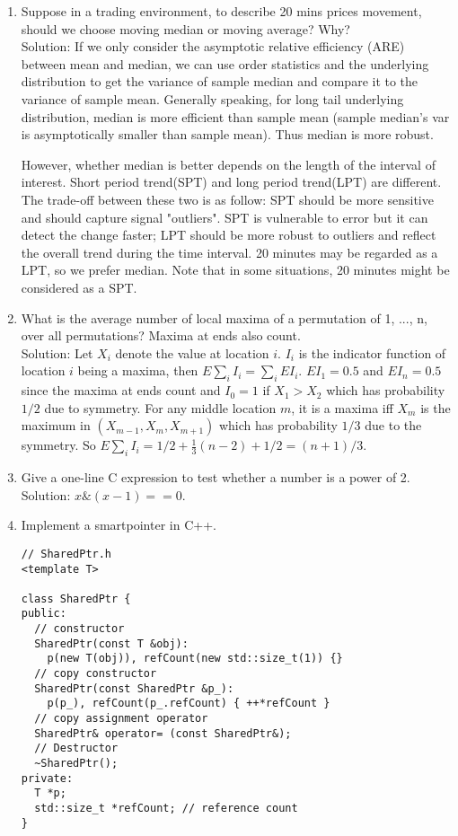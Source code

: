 \documentclass[10pt, onecolumn, draftcls]{IEEEtran}
\begin{document}
\begin{enumerate}
\item
Suppose in a trading environment, to describe 20 mins prices movement, should we choose moving median or moving average? Why?\\
{\color{red} Solution}: If we only consider the asymptotic relative efficiency (ARE) between mean and median, we can use order statistics and the underlying distribution to get the variance of sample median and compare it to the variance of sample mean. Generally speaking, for long tail underlying distribution, median is more efficient than sample mean (sample median's var is asymptotically smaller than sample mean). Thus median is more robust.
 
However, whether median is better depends on the length of the interval of interest. Short period trend(SPT) and long period trend(LPT) are different. The trade-off between these two is as follow: SPT should be more sensitive and should capture signal "outliers". SPT is vulnerable to error but it can detect the change faster; LPT should be more robust to outliers and reflect the overall trend during the time interval. 20 minutes may be regarded as a LPT, so we prefer median. Note that in some situations, 20 minutes might be considered as a SPT.

\item
What is the average number of local maxima of a permutation of 1, ..., n, over all permutations? Maxima at ends also count.\\
{\color{red} Solution}: Let $X_i$ denote the value at location $i$. $I_i$ is the indicator function of location $i$ being a maxima, then $E\sum_iI_i=\sum_iEI_i.$ $EI_1=0.5$ and $EI_n=0.5$ since the maxima at ends count and $I_0=1$ if $X_1>X_2$ which has probability $1/2$ due to symmetry. For any middle location $m$, it is a maxima iff $X_m$ is the maximum in $(X_{m-1},X_m,X_{m+1})$ which has probability $1/3$ due to the symmetry. So $E\sum_iI_i=1/2+\frac{1}{3}(n-2)+1/2=(n+1)/3.$

\item
Give a one-line C expression to test whether a number is a power of 2.\\
{\color{red} Solution}: $x\&(x-1)==0$.
\item
Implement a smartpointer in C++.
\begin{lstlisting}
// SharedPtr.h
<template T>

class SharedPtr {
public:
  // constructor
  SharedPtr(const T &obj):
    p(new T(obj)), refCount(new std::size_t(1)) {}
  // copy constructor
  SharedPtr(const SharedPtr &p_):
    p(p_), refCount(p_.refCount) { ++*refCount }
  // copy assignment operator
  SharedPtr& operator= (const SharedPtr&);
  // Destructor
  ~SharedPtr();
private:
  T *p;
  std::size_t *refCount; // reference count
}


\end{lstlisting}
\end{enumerate}
\end{document}
